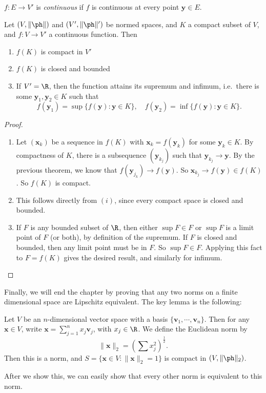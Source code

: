 \documentclass[a4paper]{article}
\begin{document}
\begin{defi}
  $f: E \to V'$ is \emph{continuous} if $f$ is continuous at every point $\mathbf{y} \in E$.
\end{defi}

\begin{thm}
  Let $(V, \|\ph\|)$ and $(V', \|\ph\|')$ be normed spaces, and $K$ a compact subset of $V$, and $f: V \to V'$ a continuous function. Then
  \begin{enumerate}
    \item $f(K)$ is compact in $V'$
    \item $f(K)$ is closed and bounded
    \item If $V' = \R$, then the function attains its supremum and infimum, i.e.\ there is some $\mathbf{y}_1, \mathbf{y}_2 \in K$ such that
      \[
        f(\mathbf{y}_1) = \sup\{f(\mathbf{y}): \mathbf{y} \in K\},\quad f(\mathbf{y}_2) = \inf\{f(\mathbf{y}): \mathbf{y} \in K\}.
      \]
  \end{enumerate}
\end{thm}

\begin{proof}\leavevmode
  \begin{enumerate}
    \item Let $(\mathbf{x}_k)$ be a sequence in $f(K)$ with $\mathbf{x}_k = f(\mathbf{y}_k)$ for some $\mathbf{y}_k \in K$. By compactness of $K$, there is a subsequence $(\mathbf{y}_{k_j})$ such that $\mathbf{y}_{k_j} \to \mathbf{y}$. By the previous theorem, we know that $f(\mathbf{y}_{j_k}) \to f(\mathbf{y})$. So $\mathbf{x}_{k_j} \to f(\mathbf{y}) \in f(K)$. So $f(K)$ is compact.
    \item This follows directly from $(i)$, since every compact space is closed and bounded.
    \item If $F$ is any bounded subset of $\R$, then either $\sup F \in F$ or $\sup F$ is a limit point of $F$ (or both), by definition of the supremum. If $F$ is closed and bounded, then any limit point must be in $F$. So $\sup F \in F$. Applying this fact to $F = f(K)$ gives the desired result, and similarly for infimum.
  \end{enumerate}
\end{proof}

Finally, we will end the chapter by proving that any two norms on a finite dimensional space are Lipschitz equivalent. The key lemma is the following:
\begin{lemma}
  Let $V$ be an $n$-dimensional vector space with a basis $\{\mathbf{v}_1, \cdots, \mathbf{v}_n\}$. Then for any $\mathbf{x} \in V$, write $\mathbf{x} = \sum_{j = 1}^n x_j \mathbf{v}_j$, with $x_j \in \R$. We define the Euclidean norm by
  \[
    \|\mathbf{x}\|_2 = \left(\sum x_j^2\right)^{\frac{1}{2}}.
  \]
  Then this is a norm, and $S = \{\mathbf{x} \in V: \|\mathbf{x}\|_2 = 1\}$ is compact in $(V, \|\ph\|_2)$.
\end{lemma}
After we show this, we can easily show that every other norm is equivalent to this norm.
\end{document}
